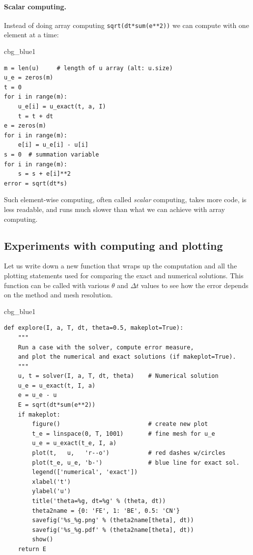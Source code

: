\documentclass[%
oneside,                 %
final,                   %
10pt]{article}
\newenvironment{_cod_tight}[1]{
   \def\FrameCommand{\colorbox{#1}}
   \FrameRule0.6pt\MakeFramed {\FrameRestore}\vskip3mm}
   {\vskip0mm\endMakeFramed}
\newenvironment{cod}[1]{
\bgroup\rmfamily
\fboxsep=0mm\relax
\begin{_cod_tight}{#1}
\list{}{\parsep=-2mm\parskip=0mm\topsep=0pt\leftmargin=2mm
\rightmargin=2\leftmargin\leftmargin=4pt\relax}
\item\relax}
{\endlist\end{_cod_tight}\egroup}
\begin{document}

\paragraph{Scalar computing.}
Instead of doing array computing \texttt{sqrt(dt*sum(e**2))} we can compute with
one element at a time:
\begin{cod}{cbg_blue1}\begin{Verbatim}[numbers=none,fontsize=\fontsize{9pt}{9pt},baselinestretch=0.95,xleftmargin=2mm]
m = len(u)     # length of u array (alt: u.size)
u_e = zeros(m)
t = 0
for i in range(m):
    u_e[i] = u_exact(t, a, I)
    t = t + dt
e = zeros(m)
for i in range(m):
    e[i] = u_e[i] - u[i]
s = 0  # summation variable
for i in range(m):
    s = s + e[i]**2
error = sqrt(dt*s)
\end{Verbatim}
\end{cod}
\noindent
Such element-wise computing, often called \emph{scalar} computing, takes
more code, is less readable, and runs much slower than what we
can achieve with array computing.





\subsection{Experiments with computing and plotting}


Let us write down a new function that wraps up the computation and all
the plotting statements used for comparing the exact and numerical
solutions. This function can be called with various $\theta$ and
$\Delta t$ values to see how the error depends on the method and mesh
resolution.

\begin{cod}{cbg_blue1}\begin{Verbatim}[numbers=none,fontsize=\fontsize{9pt}{9pt},baselinestretch=0.95,xleftmargin=2mm]
def explore(I, a, T, dt, theta=0.5, makeplot=True):
    """
    Run a case with the solver, compute error measure,
    and plot the numerical and exact solutions (if makeplot=True).
    """
    u, t = solver(I, a, T, dt, theta)    # Numerical solution
    u_e = u_exact(t, I, a)
    e = u_e - u
    E = sqrt(dt*sum(e**2))
    if makeplot:
        figure()                         # create new plot
        t_e = linspace(0, T, 1001)       # fine mesh for u_e
        u_e = u_exact(t_e, I, a)
        plot(t,   u,   'r--o')           # red dashes w/circles
        plot(t_e, u_e, 'b-')             # blue line for exact sol.
        legend(['numerical', 'exact'])
        xlabel('t')
        ylabel('u')
        title('theta=%g, dt=%g' % (theta, dt))
        theta2name = {0: 'FE', 1: 'BE', 0.5: 'CN'}
        savefig('%s_%g.png' % (theta2name[theta], dt))
        savefig('%s_%g.pdf' % (theta2name[theta], dt))
        show()
    return E
\end{Verbatim}
\end{cod}
\noindent
\end{document}
